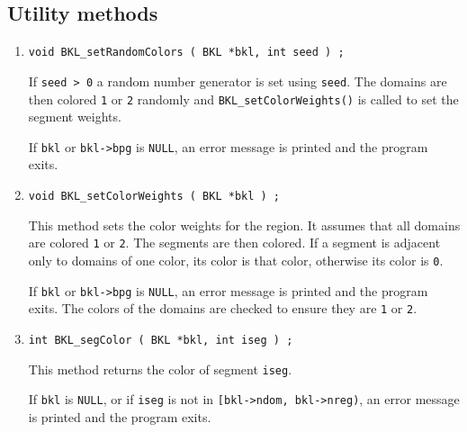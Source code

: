 \subsection{Utility methods}
\label{subsection:BKL:proto:utilities}
\par
\begin{enumerate}
\item
\begin{verbatim}
void BKL_setRandomColors ( BKL *bkl, int seed ) ;
\end{verbatim}
If {\tt seed > 0}
a random number generator is set using {\tt seed}.
The domains are then colored {\tt 1} or {\tt 2} randomly
and {\tt BKL\_setColorWeights()} is called to set the segment
weights.
\par {}
If {\tt bkl} or {\tt bkl->bpg} is {\tt NULL},
an error message is printed and the program exits.
\item
\begin{verbatim}
void BKL_setColorWeights ( BKL *bkl ) ;
\end{verbatim}
This method sets the color weights for the region.
It assumes that all domains are colored {\tt 1} or {\tt 2}.
The segments are then colored.
If a segment is adjacent only to domains of one color, its color is
that color, otherwise its color is {\tt 0}.
\par {}
If {\tt bkl} or {\tt bkl->bpg} is {\tt NULL},
an error message is printed and the program exits.
The colors of the domains are checked to ensure they are {\tt 1} or
{\tt 2}.
\item
\begin{verbatim}
int BKL_segColor ( BKL *bkl, int iseg ) ;
\end{verbatim}
This method returns the color of segment {\tt iseg}.
\par {}
If {\tt bkl} is {\tt NULL},
or if {\tt iseg} is not in {\tt [bkl->ndom, bkl->nreg)},
an error message is printed and the program exits.

\end{enumerate}
